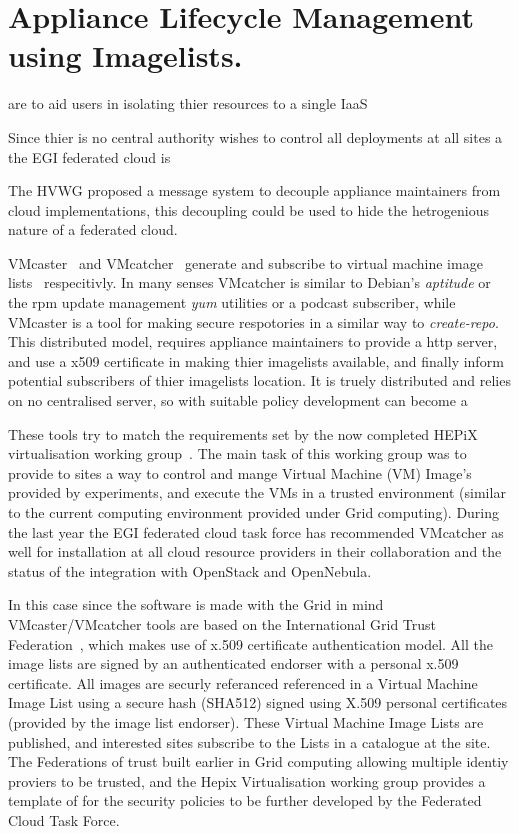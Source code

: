 \documentclass{llncs_Ibergrid2013}
\begin{document}
\section{Appliance Lifecycle Management using Imagelists.}
\label{sect-appliancelifecycle}

are to aid users in isolating thier resources to a single IaaS

Since thier is no central authority wishes to control all deployments at all sites a the EGI federated cloud is 

The HVWG proposed a message system to decouple appliance maintainers from cloud implementations, this decoupling could be used to hide the hetrogenious nature of a federated cloud.

VMcaster~\cite{vmcaster} and VMcatcher~\cite{vmcatcher} generate and subscribe to virtual machine image lists~\cite{hepix} respecitivly. In many senses VMcatcher is similar to Debian's \textit{aptitude} or the rpm update management \textit{yum} utilities or a podcast subscriber, while VMcaster is a tool for making secure respotories in a similar way to \textit{create-repo}. This distributed model, requires appliance maintainers to provide a http server, and use a x509 certificate in making thier imagelists available, and finally inform potential subscribers of thier imagelists location. It is truely distributed and relies on no centralised server, so with suitable policy development can become a 

These tools try to match the requirements set by the now completed HEPiX virtualisation working group~\cite{hepix}.
The main task of this working group was to provide to sites a way to control and mange Virtual Machine (VM) Image's provided by experiments, and execute the VMs in a trusted environment (similar to the current computing environment provided under Grid computing). During the last year the EGI federated cloud task force has recommended VMcatcher as well for installation at all cloud resource providers in their collaboration and the status of the integration with OpenStack and OpenNebula.

In this case since the software is made with the Grid in mind VMcaster/VMcatcher tools are based on the International Grid Trust Federation~\cite{igtf}, which makes use of x.509 certificate authentication model. All the image lists are signed by an authenticated endorser with a personal x.509 certificate. All images are securly referanced referenced in a Virtual Machine Image List using a secure hash (SHA512) signed using X.509 personal certificates (provided by the image list endorser). These Virtual Machine Image Lists are published, and interested sites subscribe to the Lists in a catalogue at the site. The Federations of trust built earlier in Grid computing allowing multiple identiy proviers to be trusted, and the Hepix Virtualisation working group provides a template of for the security policies to be further developed by the Federated Cloud Task Force.
\end{document}
